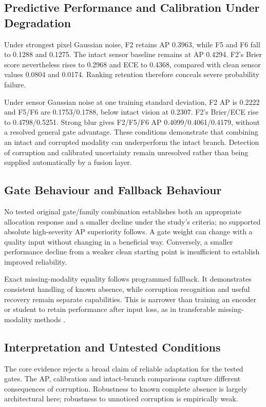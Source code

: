 \subsection{Predictive Performance and Calibration Under Degradation}
Under strongest pixel Gaussian noise, F2 retains AP 0.3963, while F5 and F6 fall to
0.1288 and 0.1275. The intact sensor baseline remains at AP 0.4294. F2's Brier score
nevertheless rises to 0.2968 and ECE to 0.4368, compared with clean sensor values 0.0804
and 0.0174. Ranking retention therefore conceals severe probability failure.

Under sensor Gaussian noise at one training standard deviation, F2 AP is 0.2222 and
F5/F6 are 0.1753/0.1788, below intact vision at 0.2307. F2's Brier/ECE rise to
0.4798/0.5251. Strong blur gives F2/F5/F6 AP 0.4099/0.4061/0.4179, without a resolved
general gate advantage. These conditions demonstrate that combining an intact and
corrupted modality can underperform the intact branch. Detection of corruption and
calibrated uncertainty remain unresolved rather than being supplied automatically by a
fusion layer.

\subsection{Gate Behaviour and Fallback Behaviour}
No tested original gate/family combination establishes both an appropriate allocation
response and a smaller decline under the study's criteria; no supported absolute
high-severity AP superiority follows. A gate weight can change with a quality input
without changing in a beneficial way. Conversely, a smaller performance decline from a
weaker clean starting point is insufficient to establish improved reliability.

Exact missing-modality equality follows programmed fallback. It demonstrates consistent
handling of known absence, while corruption recognition and useful recovery remain
separate capabilities. This is narrower than training an encoder or student to retain
performance after input loss, as in transferable missing-modality methods
\citep{P005,P007,P016}.

\subsection{Interpretation and Untested Conditions}
The core evidence rejects a broad claim of reliable adaptation for the tested gates. The
AP, calibration and intact-branch comparisons capture different consequences of
corruption. Robustness to known complete absence is largely architectural here;
robustness to unnoticed corruption is empirically weak.

